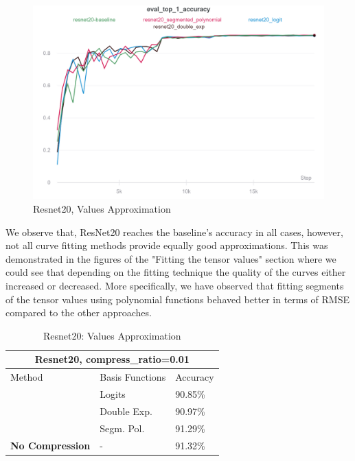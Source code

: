     \begin{figure}[h]
    \centering
    \includegraphics[width=1\textwidth]{thesis/figures/resnet-values-approx.png}
    \caption{Resnet20, Values Approximation}
    \label{resnet_val_approx}
    \end{figure}
    
    We observe that, ResNet20 reaches the baseline's accuracy in all cases, however, not all curve fitting methods provide equally good approximations.
    This was demonstrated in the figures of the "Fitting the tensor values" section where we could see that depending on the fitting technique the quality of the curves either increased or decreased.
    More specifically, we have observed that fitting segments of the tensor values using polynomial functions behaved better in terms of RMSE compared to the other approaches.
    
    \vspace{1cm}

    \begin{table}[h!]
    \footnotesize
     \centering
    \begin{tabular}{ |p{3cm}||p{3cm}|p{1.5cm}|}
    \hline
    \multicolumn{4}{|c|}{\textbf{\footnotesize Resnet20, compress\_ratio=0.01}} \\
    \hline
    \rule{0pt}{3ex}
    	Method & Basis Functions  & Accuracy\\
    \hline
    \rule{0pt}{3ex}
    \multirow{4}{*}{\textbf{Values Approx.}}
    & Logits       &90.85\%\\
    & Double Exp.  &90.97\%\\
    & Segm. Pol.   &91.29\%\\
    \hline
    \rule{0pt}{3ex}
    \textbf{No Compression} & -   &91.32\%\\
    \hline
    \end{tabular}
    \caption{Resnet20: Values Approximation}
    \label{table:6}
    \end{table}
    
